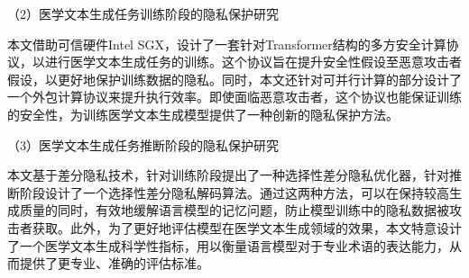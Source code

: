 （2）医学文本生成任务训练阶段的隐私保护研究

本文借助可信硬件Intel SGX，设计了一套针对Transformer结构的多方安全计算协议，以进行医学文本生成任务的训练。这个协议旨在提升安全性假设至恶意攻击者假设，以更好地保护训练数据的隐私。同时，本文还针对可并行计算的部分设计了一个外包计算协议来提升执行效率。即使面临恶意攻击者，这个协议也能保证训练的安全性，为训练医学文本生成模型提供了一种创新的隐私保护方法。

（3）医学文本生成任务推断阶段的隐私保护研究



本文基于差分隐私技术，针对训练阶段提出了一种选择性差分隐私优化器，针对推断阶段设计了一个选择性差分隐私解码算法。通过这两种方法，可以在保持较高生成质量的同时，有效地缓解语言模型的记忆问题，防止模型训练中的隐私数据被攻击者获取。此外，为了更好地评估模型在医学文本生成领域的效果，本文特意设计了一个医学文本生成科学性指标，用以衡量语言模型对于专业术语的表达能力，从而提供了更专业、准确的评估标准。



